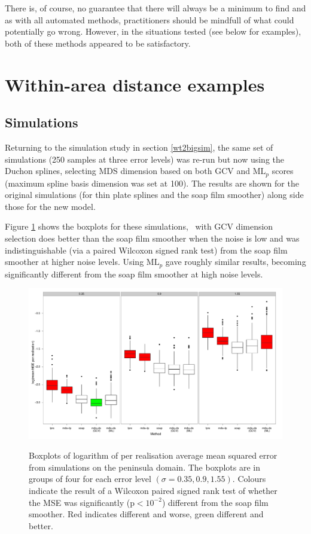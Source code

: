 There is, of course, no guarantee that there will always be a minimum to find and as with all automated methods, practitioners should be mindfull of what could potentially go wrong. However, in the situations tested (see below for examples), both of these methods appeared to be satisfactory.

\section{Within-area distance examples}
\label{gds-wad-examples}
\subsection{Simulations}

Returning to the simulation study in section \ref{wt2bigsim}, the same set of simulations (250 samples at three error levels) was re-run but now using the Duchon splines, selecting MDS dimension based on both GCV and $\text{ML}_p$ scores (maximum spline basis dimension was set at 100). The results are shown for the original simulations (for thin plate splines and the soap film smoother) along side those for the new model.

Figure \ref{wt2-boxplot-duchon} shows the boxplots for these simulations, \mdsds\ with GCV dimension selection does better than the soap film smoother when the noise is low and was indistinguishable (via a paired Wilcoxon signed rank test) from the soap film smoother at higher noise levels. Using $\text{ML}_p$ gave roughly similar results, becoming significantly different from the soap film smoother at high noise levels.

\begin{figure}
\centering
\includegraphics[width=6in]{mds/figs/wt2-boxplot-duchon.pdf} \\
\caption{Boxplots of logarithm of per realisation average mean squared error from simulations on the peninsula domain. The boxplots are in groups of four for each error level $(\sigma = 0.35, 0.9, 1.55)$. Colours indicate the result of a Wilcoxon paired signed rank test of whether the MSE was significantly (p$<10^{-2}$) different from the soap film smoother. Red indicates different and worse, green different and better.}
\label{wt2-boxplot-duchon}
\end{figure}

